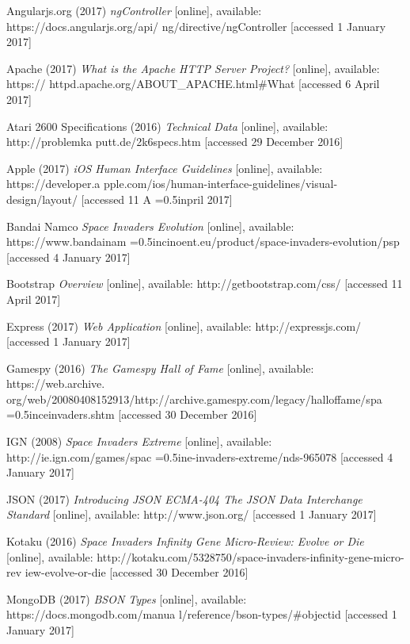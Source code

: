 \documentclass[12pt]{article}
\begin{document}
Angularjs.org (2017) \textit{ngController} [online], available: https://docs.angularjs.org/api/
\hangindent=0.5in ng/directive/ngController [accessed 1 January 2017]

Apache (2017) \textit{What is the Apache HTTP Server Project?} [online], available: https://
\hangindent=0.5in httpd.apache.org/ABOUT{\_}APACHE.html{\#}What [accessed 6 April 2017]

Atari 2600 Specifications (2016) \textit{Technical Data} [online], available: http://problemka
\hangindent=0.5in putt.de/2k6specs.htm [accessed 29 December 2016]

Apple (2017) \textit{iOS Human Interface Guidelines} [online], available: https://developer.a
\hangindent=0.5in pple.com/ios/human-interface-guidelines/visual-design/layout/ [accessed 11 A
\hangindent=0.5inpril 2017]

Bandai Namco \textit{Space Invaders Evolution} [online], available:
https://www.bandainam
\hangindent=0.5incinoent.eu/product/space-invaders-evolution/psp [accessed
4 January 2017]

Bootstrap \textit{Overview} [online], available: http://getbootstrap.com/css/ [accessed 11 \hangindent=0.5in April 2017]

Express (2017) \textit{Web Application} [online], available: http://expressjs.com/ [accessed 
\hangindent=0.5in 1 January 2017]

Gamespy (2016) \textit{The Gamespy Hall of Fame} [online], available: https://web.archive.
\hangindent=0.5in org/web/20080408152913/http://archive.gamespy.com/legacy/halloffame/spa
\hangindent=0.5inceinvaders.shtm [accessed 30 December 2016]

IGN (2008) \textit{Space Invaders Extreme} [online], available: http://ie.ign.com/games/spac \hangindent=0.5ine-invaders-extreme/nds-965078 [accessed 4 January 2017]

JSON (2017) \textit{Introducing JSON ECMA-404 The JSON Data Interchange Standard} [online], available: \hangindent=0.5in http://www.json.org/ [accessed 1 January 2017]

Kotaku (2016) \textit{Space Invaders Infinity Gene Micro-Review: Evolve or Die} [online], 
\hangindent=0.5in available: http://kotaku.com/5328750/space-invaders-infinity-gene-micro-rev
\hangindent=0.5in iew-evolve-or-die [accessed 30 December 2016]

MongoDB (2017) \textit{BSON Types} [online], available: https://docs.mongodb.com/manua
\hangindent=0.5in l/reference/bson-types/{\#}objectid [accessed 1 January 2017]
\end{document}
